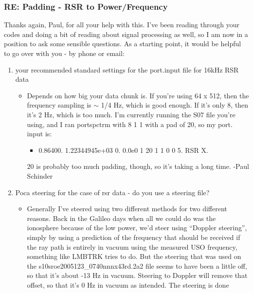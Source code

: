 \documentclass[crop=false,class=article,oneside]{standalone}
\begin{document}
\subsubsection{\footnotesize RE: Padding - RSR to Power/Frequency}
Thanks again, Paul, for all your help with this. I've been reading through your codes and doing a bit of reading about signal processing as well, so I am now in a position to ask some sensible questions. As a starting point, it would be helpful to go over with you - by phone or email:
\begin{enumerate}
    \item your recommended standard settings for the port.input file for 16kHz RSR data
    \begin{itemize}
        \item Depends on how big your data chunk is. If you’re using
              64 x 512, then the frequency sampling is $\sim$ 1/4 Hz,
              which is good enough.  If it’s only 8, then it’s 2 Hz,
              which is too much. I’m currently running the S07 file
              you’re using, and I ran portspctrm with 8 1 1 with a
              pad of 20, so my port. input is:
            \begin{itemize}
                \item 0.86400. 1.22344945e+03 0. 0.0e0 1 20 1 1 0 0 5. RSR X.
            \end{itemize}
        20 is probably too much padding, though, so it’s taking a long time. -Paul Schinder
    \end{itemize}
    \item Poca steering for the case of rsr data - do you use a
          steering file?
    \begin{itemize}
        \item Generally I've steered using two different methods for
              two different reasons.  Back in the Galileo days when
              all we could do was the ionosphere because of the low
              power, we'd steer using ``Doppler steering'', simply
              by using a prediction of the frequency that should be
              received if the ray path is entirely in vacuum using
              the measured USO frequency, something like LMBTRK tries
              to do.  But the steering that was used on the
              s10sroe2005123\_0740nnnx43rd.2a2 file seems to have
              been a little off, so that it's about -13 Hz in vacuum.
              Steering to Doppler will remove that offset, so that
              it’s 0 Hz in vacuum as intended.  The steering is done

\end{itemize}
\end{enumerate}
\end{document}

